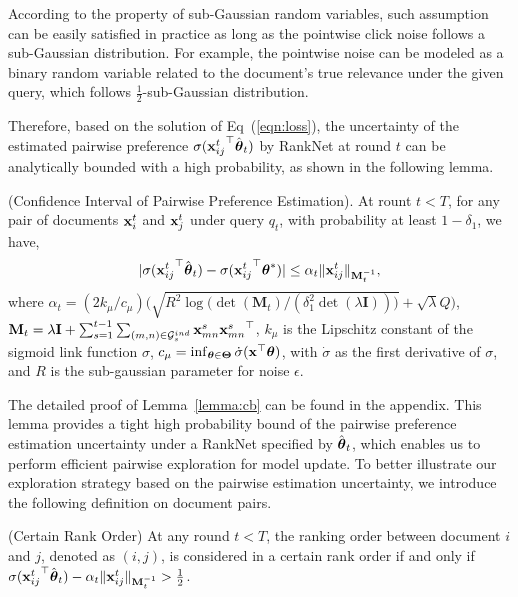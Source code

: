According to the property of sub-Gaussian random variables, such assumption can be easily satisfied in practice as long as the pointwise click noise follows a sub-Gaussian distribution. For example, the pointwise noise can be modeled as a binary random variable related to the document's true relevance under the given query, which follows $\frac{1}{2}$-sub-Gaussian distribution.

Therefore, based on the solution of Eq~(\ref{eqn:loss}), the uncertainty of the estimated pairwise preference $\sigma({\mathbf{x}_{ij}^t}^\top \hat{\boldsymbol{\theta}}_t)$ by RankNet at round $t$ can be analytically bounded with a high probability, as shown in the following lemma.

\begin{lemma} (Confidence Interval of Pairwise Preference Estimation). At rount $t < T$, for any pair of documents $\mathbf{x}_i^t$ and $\mathbf{x}_j^t$ under query $q_t$, with probability at least $1 - \delta_1$, we have,
\begin{equation*}
    |\sigma({{\mathbf{x}_{ij}^t}}^\top \hat{\boldsymbol{\theta}}_t) - \sigma({{\mathbf{x}_{ij}^t}}^\top \boldsymbol{\theta}^*) | \leq \alpha_t\Vert{\mathbf{x}_{ij}^t}\Vert_{\mathbf{M}_t^{-1}},
\end{equation*}
where $\alpha_t = ({2k_{\mu}}/{c_{\mu}}) \Big(\sqrt{R^2\log{({\det(\mathbf{M}_t)}/({\delta_1^2 \det(\lambda \mathbf{I})})})} + \sqrt{\lambda} Q\Big)$, $\mathbf{M}_t = \lambda \mathbf{I} + \sum_{s =1}^{t-1}\sum_{(m, n) \in \mathcal{G}^{ind}_{s}}{\mathbf{x}_{mn}^s}{\mathbf{x}_{mn}^s}^\top$, $k_{\mu}$ is the Lipschitz constant of the sigmoid link function $\sigma$, $c_{\mu} = \inf_{\boldsymbol{\theta} \in \boldsymbol{\Theta}} \dot{\sigma}(\mathbf{x}^\top\boldsymbol{\theta})$, with $\dot{\sigma}$ as the first derivative of $\sigma$, and $R$ is the sub-gaussian parameter for noise $\epsilon$.
\label{lemma:cb}
\end{lemma}

The detailed proof of Lemma~\ref{lemma:cb} can be found in the appendix. This lemma provides a tight high probability bound of the pairwise preference estimation uncertainty under a RankNet specified by $\hat{\boldsymbol{\theta}}_t$, which enables us to perform efficient pairwise exploration for model update. To better illustrate our exploration strategy based on the pairwise estimation uncertainty, we introduce the following definition on document pairs.

\begin{definition} (Certain Rank Order)
At any round $t < T$, the ranking order between document $i$ and $j$, denoted as $(i, j)$, is considered in a certain rank order if and only if $\sigma({\mathbf{x}_{ij}^t}^\top\hat{\boldsymbol{\theta}}_t) - \alpha_{t}\Vert\mathbf{x}_{ij}^t\Vert_{\mathbf{M}_t^{-1}} > \frac{1}{2}$.
\end{definition}

